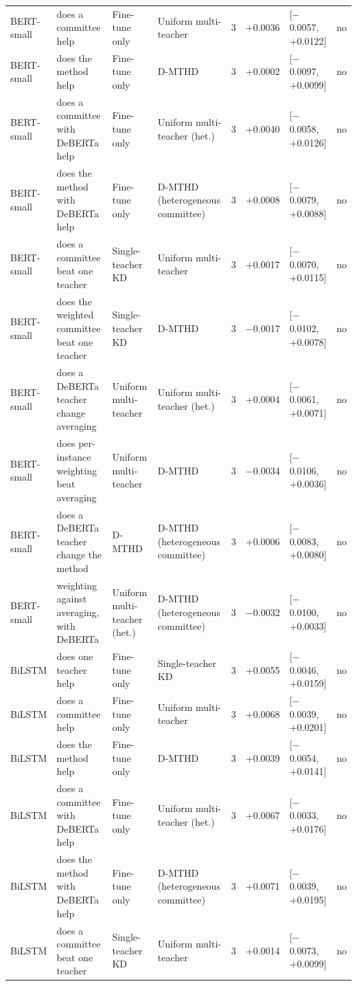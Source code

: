 {\begin{longtable}{p{1.5cm}p{2.9cm}p{2.5cm}p{2.6cm}cp{1.0cm}p{1.8cm}c}
BERT-small & does a committee help & Fine-tune only & Uniform multi-teacher & 3 & +0.0036 & [$-$0.0057, +0.0122] & no \\
BERT-small & does the method help & Fine-tune only & D-MTHD & 3 & +0.0002 & [$-$0.0097, +0.0099] & no \\
BERT-small & does a committee with DeBERTa help & Fine-tune only & Uniform multi-teacher (het.) & 3 & +0.0040 & [$-$0.0058, +0.0126] & no \\
BERT-small & does the method with DeBERTa help & Fine-tune only & D-MTHD (heterogeneous committee) & 3 & +0.0008 & [$-$0.0079, +0.0088] & no \\
BERT-small & does a committee beat one teacher & Single-teacher KD & Uniform multi-teacher & 3 & +0.0017 & [$-$0.0070, +0.0115] & no \\
BERT-small & does the weighted committee beat one teacher & Single-teacher KD & D-MTHD & 3 & $-$0.0017 & [$-$0.0102, +0.0078] & no \\
BERT-small & does a DeBERTa teacher change averaging & Uniform multi-teacher & Uniform multi-teacher (het.) & 3 & +0.0004 & [$-$0.0061, +0.0071] & no \\
BERT-small & does per-instance weighting beat averaging & Uniform multi-teacher & D-MTHD & 3 & $-$0.0034 & [$-$0.0106, +0.0036] & no \\
BERT-small & does a DeBERTa teacher change the method & D-MTHD & D-MTHD (heterogeneous committee) & 3 & +0.0006 & [$-$0.0083, +0.0080] & no \\
BERT-small & weighting against averaging, with DeBERTa & Uniform multi-teacher (het.) & D-MTHD (heterogeneous committee) & 3 & $-$0.0032 & [$-$0.0100, +0.0033] & no \\
BiLSTM & does one teacher help & Fine-tune only & Single-teacher KD & 3 & +0.0055 & [$-$0.0046, +0.0159] & no \\
BiLSTM & does a committee help & Fine-tune only & Uniform multi-teacher & 3 & +0.0068 & [$-$0.0039, +0.0201] & no \\
BiLSTM & does the method help & Fine-tune only & D-MTHD & 3 & +0.0039 & [$-$0.0054, +0.0141] & no \\
BiLSTM & does a committee with DeBERTa help & Fine-tune only & Uniform multi-teacher (het.) & 3 & +0.0067 & [$-$0.0033, +0.0176] & no \\
BiLSTM & does the method with DeBERTa help & Fine-tune only & D-MTHD (heterogeneous committee) & 3 & +0.0071 & [$-$0.0039, +0.0195] & no \\
BiLSTM & does a committee beat one teacher & Single-teacher KD & Uniform multi-teacher & 3 & +0.0014 & [$-$0.0073, +0.0099] & no \\

\end{longtable}}
